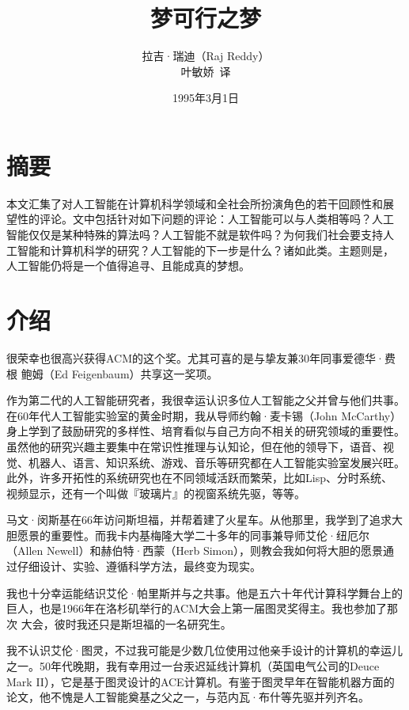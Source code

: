\documentclass[12pt,a4paper]{article}
\begin{document}
\title{\whei 梦可行之梦}
\author{\kai 拉吉·瑞迪（Raj Reddy）\\
  \kai 叶敏娇~译}
\date{\kai 1995年3月1日}

\maketitle

\section{摘要}
本文汇集了对人工智能在计算机科学领域和全社会所扮演角色的若干回顾性和展
望性的评论。文中包括针对如下问题的评论：人工智能可以与人类相等吗？人工
智能仅仅是某种特殊的算法吗？人工智能不就是软件吗？为何我们社会要支持人
工智能和计算机科学的研究？人工智能的下一步是什么？诸如此类。主题则是，
人工智能仍将是一个值得追寻、且能成真的梦想。

\section{介绍}
很荣幸也很高兴获得ACM的这个奖。尤其可喜的是与挚友兼30年同事爱德华·费根
鲍姆（Ed Feigenbaum）共享这一奖项。

作为第二代的人工智能研究者，我很幸运认识多位人工智能之父并曾与他们共事。
在60年代人工智能实验室的黄金时期，我从导师约翰·麦卡锡（John McCarthy）
身上学到了鼓励研究的多样性、培育看似与自己方向不相关的研究领域的重要性。
虽然他的研究兴趣主要集中在常识性推理与认知论，但在他的领导下，语音、视
觉、机器人、语言、知识系统、游戏、音乐等研究都在人工智能实验室发展兴旺。
此外，许多开拓性的系统研究也在不同领域活跃而繁荣，比如Lisp、分时系统、
视频显示，还有一个叫做『玻璃片』的视窗系统先驱，等等。

马文·闵斯基在66年访问斯坦福，并帮着建了火星车。从他那里，我学到了追求大
胆愿景的重要性。而我卡内基梅隆大学二十多年的同事兼导师艾伦·纽厄尔
（Allen Newell）和赫伯特·西蒙（Herb Simon），则教会我如何将大胆的愿景通
过仔细设计、实验、遵循科学方法，最终变为现实。

我也十分幸运能结识艾伦·帕里斯并与之共事。他是五六十年代计算科学舞台上的
巨人，也是1966年在洛杉矶举行的ACM大会上第一届图灵奖得主。我也参加了那次
大会，彼时我还只是斯坦福的一名研究生。

我不认识艾伦·图灵，不过我可能是少数几位使用过他亲手设计的计算机的幸运儿
之一。50年代晚期，我有幸用过一台汞迟延线计算机（英国电气公司的Deuce
Mark II），它是基于图灵设计的ACE计算机。有鉴于图灵早年在智能机器方面的
论文，他不愧是人工智能奠基之父之一，与范内瓦·布什等先驱并列齐名。
\end{document}
